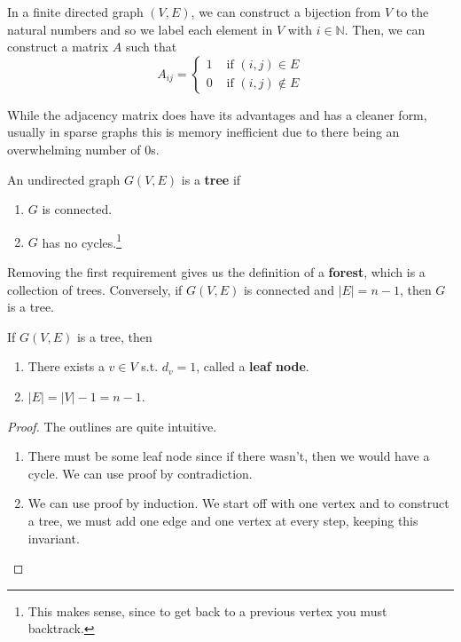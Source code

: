\documentclass{article}
\begin{document}
    \begin{definition}
      In a finite directed graph $(V, E)$, we can construct a bijection from $V$ to the natural numbers and so we label each element in $V$ with $i \in \mathbb{N}$. Then, we can construct a matrix $A$ such that 
      \begin{equation}
        A_{ij} = \begin{cases} 1 & \text{ if } (i, j) \in E \\ 0 & \text{ if } (i, j) \not\in E \end{cases}
      \end{equation}
    \end{definition}

    While the adjacency matrix does have its advantages and has a cleaner form, usually in sparse graphs this is memory inefficient due to there being an overwhelming number of $0$s. 

    \begin{definition}[Trees]
      An undirected graph $G(V, E)$ is a \textbf{tree} if 
      \begin{enumerate}
        \item $G$ is connected. 
        \item $G$ has no cycles.\footnote{This makes sense, since to get back to a previous vertex you must backtrack.}
      \end{enumerate}
      Removing the first requirement gives us the definition of a \textbf{forest}, which is a collection of trees. Conversely, if $G(V, E)$ is connected  and $|E| = n - 1$, then $G$ is a tree. 
    \end{definition}

    \begin{theorem}
      If $G(V, E)$ is a tree, then 
      \begin{enumerate}
        \item There exists a $v \in V$ s.t. $d_v = 1$, called a \textbf{leaf node}. 
        \item $|E| = |V| - 1 = n - 1$. 
      \end{enumerate}
    \end{theorem}
    \begin{proof}
      The outlines are quite intuitive. 
      \begin{enumerate}
        \item There must be some leaf node since if there wasn't, then we would have a cycle. We can use proof by contradiction. 
        \item We can use proof by induction. We start off with one vertex and to construct a tree, we must add one edge and one vertex at every step, keeping this invariant.  
      \end{enumerate}
    \end{proof}
\end{document}
